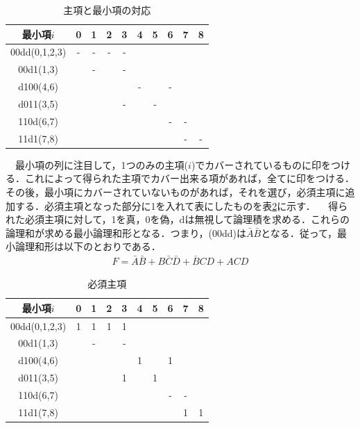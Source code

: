 \documentclass[11pt,a4paper]{jsarticle}
\begin{document}
\begin{table}[h]
 \centering
\caption{主項と最小項の対応}
\label{tab7}
 \begin{tabular}{|c|c|c|c|c|c|c|c|c|c|} \hline
  最小項$i$    & 0 & 1 & 2 & 3 & 4 & 5 & 6 & 7 & 8 \\ \hline
  00dd(0,1,2,3)& - & - & - & - &   &   &   &   &   \\ \hline
  00d1(1,3)    &   & - &   & - &   &   &   &   &   \\ \hline
  d100(4,6)    &   &   &   &   & - &   & - &   &   \\ \hline
  d011(3,5)    &   &   &   & - &   & - &   &   &   \\ \hline
  110d(6,7)    &   &   &   &   &   &   & - & - &   \\ \hline
  11d1(7,8)    &   &   &   &   &   &   &   & - & - \\ \hline
\end{tabular}
\end{table}
　最小項の列に注目して，1つのみの主項($i$)でカバーされているものに印をつける．これによって得られた主項でカバー出来る項があれば，全てに印をつける．その後，最小項にカバーされていないものがあれば，それを選び，必須主項に追加する．必須主項となった部分に1を入れて表にしたものを表\ref{tab8}に示す．
　得られた必須主項に対して，1を真，0を偽，dは無視して論理積を求める．これらの論理和が求める最小論理和形となる．つまり，(00dd)は$\bar A \bar B$となる．従って，最小論理和形は以下のとおりである．
\begin{eqnarray*}
 F = \bar A \bar B + B \bar C \bar D + \bar B CD + ACD
\end{eqnarray*}

\thispagestyle{fancy}
\cfoot{}

\newpage
\thispagestyle{fancy}
\cfoot{}


\begin{table}[H]
 \centering
 \caption{必須主項}
 \label{tab8}
 \begin{tabular}{|c|c|c|c|c|c|c|c|c|c|} \hline
  最小項$i$    & 0 & 1 & 2 & 3 & 4 & 5 & 6 & 7 & 8 \\ \hline
  00dd(0,1,2,3)& 1 & 1 & 1 & 1 &   &   &   &   &   \\\hline 
  00d1(1,3)    &   & - &   & - &   &   &   &   &   \\  \hline 
  d100(4,6)    &   &   &   &   & 1 &   & 1 &   &   \\  \hline 
  d011(3,5)    &   &   &   & 1 &   & 1 &   &   &   \\  \hline 
  110d(6,7)    &   &   &   &   &   &   & - & - &   \\  \hline 
  11d1(7,8)    &   &   &   &   &   &   &   & 1 & 1 \\  \hline 
 \end{tabular}
\end{table}
\end{document}
